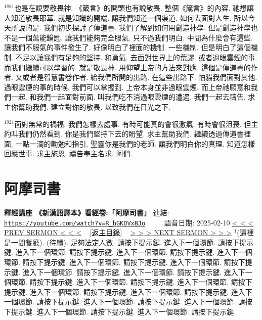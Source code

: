\documentclass{book}
\begin{document}
$^{1881}$也是在說要敬畏神.
《箴言》的開頭也有說敬畏.
整個《箴言》的內容.
祂想讓人知道敬畏耶華.
就是知識的開端.
讓我們知道一個渠道.
如何去面對人生.
所以今天所說的是.
我們初步探討了傳道書.
我們了解到如何用創造神學.
但是創造神學也不是一個萬能鑰匙.
讓我們能夠完全服氣.
只不過我們明白.
中間為什麼會有這些.
讓我們不服氣的事件發生了.
好像明白了裡面的機制.
一些機制.
但是明白了這個機制.
不足以讓我們有足夠的堅持.
和勇氣.
去面對世界上的荒謬.
或者過眼雲煙的事.
而我們繼續可以學習的.
就是敬畏神.
用仰望上帝的方法來對應.
這個是傳道書的作者.
又或者是智慧書卷作者.
給我們所開的出路.
在這些出路下.
怕貓我們面對其他.
過眼雲煙的事的時候.
我們可以掌握到.
上帝本身並非過眼雲煙.
而上帝祂願意和我們一起.
和我們一起面對前面.
叫我們吃不消過眼雲煙的遭遇.
我們一起去禱告.
求主你幫助我們.
建立對你的敬畏.
以致我們在日光之下.

$^{1921}$面對無常的禍福.
我們怎樣去處事.
有時可能真的會很激氣.
有時會很沮喪.
但主約叫我們仍然看到.
你是我們堅持下去的盼望.
求主幫助我們.
繼續透過傳道書裡面.
一點一滴的勸勉和指引.
聖靈你是我們的老師.
讓我們明白你的真理.
知道怎樣回應世事.
求主施恩.
禱告奉主名求.
阿們.
\newpage



\section{阿摩司書}
\label{sec:R_hGKDVxBJo}
\textbf{釋經講座 《新漢語譯本》看經卷:「阿摩司書」}
\newline
\newline
連結: \href{https://youtube.com/watch?v=R_hGKDVxBJo}{\texttt{https://youtube.com/watch?v=R\_hGKDVxBJo}} ~~~~ 語音日期: 2025-02-10
\newline
\newline
\hyperref[sec:g3ZOKNZeTdE]{\small{< < < PREV SERMON < < <}}
~
\hyperref[sec:index]{\small{[返主目錄]}}
~
\hyperref[sec:PXrzuzW_8_I]{\small{> > > NEXT SERMON > > >}}
\newline
\newline
$^{1}$(這裡是一間餐廳).
(待續).
足夠法定人數.
請按下提示鍵.
進入下一個環節.
請按下提示鍵.
進入下一個環節.
請按下提示鍵.
進入下一個環節.
請按下提示鍵.
進入下一個環節.
請按下提示鍵.
進入下一個環節.
請按下提示鍵.
進入下一個環節.
請按下提示鍵.
進入下一個環節.
請按下提示鍵.
進入下一個環節.
請按下提示鍵.
進入下一個環節.
請按下提示鍵.
進入下一個環節.
請按下提示鍵.
進入下一個環節.
請按下提示鍵.
進入下一個環節.
請按下提示鍵.
進入下一個環節.
請按下提示鍵.
進入下一個環節.
請按下提示鍵.
進入下一個環節.
請按下提示鍵.
進入下一個環節.
請按下提示鍵.
進入下一個環節.
請按下提示鍵.
進入下一個環節.
請按下提示鍵.
\end{document}

